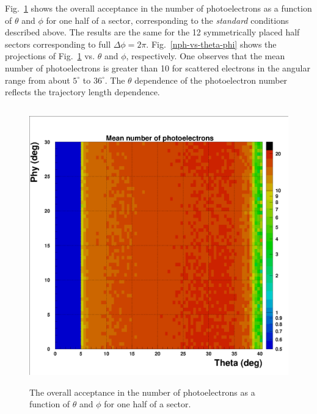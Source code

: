 Fig.~\ref{nph-accept-2d} shows the overall acceptance in the number of 
photoelectrons as a function of $\theta$ and $\phi$ for one half of a 
sector, corresponding to the {\it standard} conditions described above. 
The results are the same for the 12 symmetrically placed half sectors 
corresponding to full $\Delta\phi = 2 \pi$.  Fig.~\ref{nph-vs-theta-phi} 
shows the projections of Fig.~\ref{nph-accept-2d} vs. $\theta$ and $\phi$,
respectively.  One observes that the mean number of photoelectrons is 
greater than 10 for scattered electrons in the angular range from about 
$5^\circ$ to $36^\circ$.  The $\theta$ dependence of the photoelectron 
number reflects the trajectory length dependence.

\begin{figure}[htbp]
\centering
\includegraphics[height=12cm,angle=0]{MC-simulation/nph-accept-2d.eps}
\caption{\small{The overall acceptance in the number of photoelectrons
as a function of $\theta$ and $\phi$ for one half of a sector.}}
\label{nph-accept-2d}
\end{figure}

